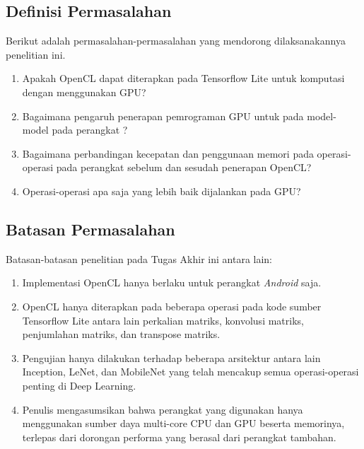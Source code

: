 \subsection{Definisi Permasalahan}
Berikut adalah permasalahan-permasalahan yang mendorong dilaksanakannya penelitian ini.
\begin{enumerate}
\item Apakah OpenCL dapat diterapkan pada Tensorflow Lite untuk komputasi dengan menggunakan \mobile GPU?
\item Bagaimana pengaruh penerapan pemrograman GPU untuk \inference pada model-model \deeplearning pada perangkat \mobile?
\item Bagaimana perbandingan kecepatan dan penggunaan memori pada operasi-operasi \deeplearning \inference pada perangkat \mobile sebelum dan sesudah penerapan OpenCL?
\item Operasi-operasi \deeplearning \inference apa saja yang lebih baik dijalankan pada \mobile GPU?

\end{enumerate}

\subsection{Batasan Permasalahan}
Batasan-batasan penelitian pada Tugas Akhir ini antara lain:
\begin{enumerate}
\item Implementasi OpenCL hanya berlaku untuk perangkat \textit{Android} saja.
\item OpenCL hanya diterapkan pada beberapa operasi \deeplearning \inference pada kode sumber Tensorflow Lite antara lain perkalian matriks, konvolusi matriks, penjumlahan matriks, dan transpose matriks.
\item Pengujian hanya dilakukan terhadap beberapa arsitektur \conv \nn antara lain Inception, LeNet, dan MobileNet yang telah mencakup semua operasi-operasi penting di Deep Learning.
\item Penulis mengasumsikan bahwa perangkat yang digunakan hanya menggunakan
sumber daya multi-core CPU dan GPU beserta memorinya, terlepas dari dorongan performa yang berasal dari perangkat tambahan.
\end{enumerate}

